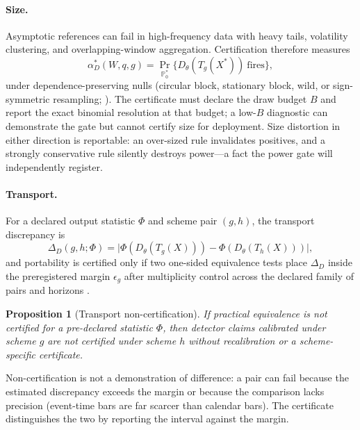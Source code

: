 \documentclass[3p]{elsarticle}
\newtheorem{proposition}{Proposition}
\newcommand{\epsg}{\ensuremath{\epsilon_g}}
\begin{document}
\paragraph{Size.} Asymptotic references can fail in high-frequency data with
heavy tails, volatility clustering, and overlapping-window aggregation.
Certification therefore measures
\begin{equation}
  \alpha_D^\ast(W,q,g)
  =
  \Pr_{\mathbb{P}_0^\ast}\{D_\theta(T_g(X^\ast))\ \text{fires}\},
  \label{eq:size}
\end{equation}
under dependence-preserving nulls (circular block, stationary block, wild, or
sign-symmetric resampling; \citealp{Kunsch1989,PolitisRomano1994}). The
certificate must declare the draw budget $B$ and report the exact binomial
resolution at that budget; a low-$B$ diagnostic can demonstrate the gate but
cannot certify size for deployment. Size distortion in either direction is
reportable: an over-sized rule invalidates positives, and a strongly
conservative rule silently destroys power---a fact the power gate will
independently register.

\paragraph{Transport.} For a declared output statistic $\Phi$ and scheme pair
$(g,h)$, the transport discrepancy is
\begin{equation}
  \Delta_D(g,h;\Phi)
  =
  \bigl|\Phi(D_\theta(T_g(X))) - \Phi(D_\theta(T_h(X)))\bigr|,
  \label{eq:transport}
\end{equation}
and portability is certified only if two one-sided equivalence tests place
$\Delta_D$ inside the preregistered margin $\epsg$ after multiplicity control
across the declared family of pairs and horizons
\citep{Schuirmann1987,Holm1979}.

\begin{proposition}[Transport non-certification]
\label{prop:transport}
If practical equivalence is not certified for a pre-declared statistic
$\Phi$, then detector claims calibrated under scheme $g$ are not certified
under scheme $h$ without recalibration or a scheme-specific certificate.
\end{proposition}

Non-certification is not a demonstration of difference: a pair can fail
because the estimated discrepancy exceeds the margin or because the
comparison lacks precision (event-time bars are far scarcer than calendar
bars). The certificate distinguishes the two by reporting the interval
against the margin.
\end{document}
